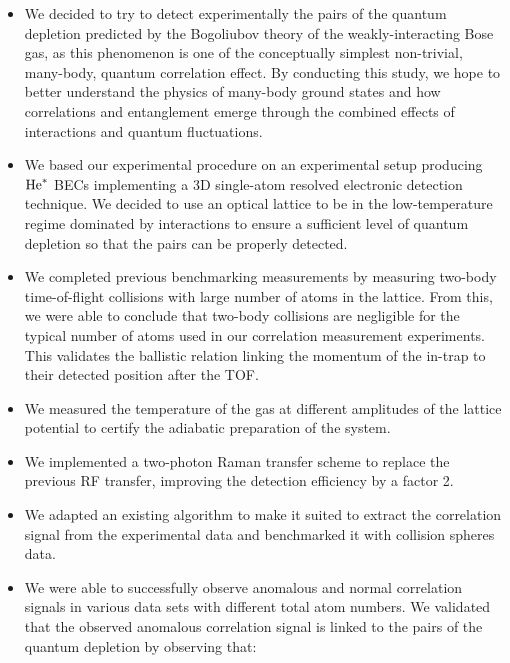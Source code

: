 \begin{itemize}
    \item We decided to try to detect experimentally the \kmk pairs of the quantum depletion predicted by the Bogoliubov theory of the weakly-interacting Bose gas, as this phenomenon is one of the conceptually simplest non-trivial, many-body, quantum correlation effect. By conducting this study, we hope to better understand the physics of many-body ground states and how correlations and entanglement emerge through the combined effects of interactions and quantum fluctuations.
    \item We based our experimental procedure on an experimental setup producing $\mathrm{He}^*$ BECs  implementing a 3D single-atom resolved electronic detection technique. We decided to use an optical lattice to be in the low-temperature regime dominated by interactions to ensure a sufficient level of quantum depletion so that the \kmk pairs can be properly detected.
    \item We completed previous benchmarking measurements \cite{cayla2018single} by measuring two-body time-of-flight collisions with large number of atoms in the lattice. From this, we were able to conclude that two-body collisions are negligible for the typical number of atoms used in our correlation measurement experiments. This validates the ballistic relation linking the momentum of the in-trap to their detected position after the TOF.
    \item We measured the temperature of the gas at different amplitudes of the lattice potential to certify the adiabatic preparation of the system.
    \item We implemented a two-photon Raman transfer scheme to replace the previous RF transfer, improving the detection efficiency by a factor 2.
    \item We adapted an existing algorithm to make it suited to extract the \kmk correlation signal from the experimental data and benchmarked it with collision spheres data.
    \item We were able to successfully observe anomalous and normal correlation signals in various data sets with different total atom numbers. We validated that the observed anomalous correlation signal is linked to the \kmk pairs of the quantum depletion by observing that:
    \begin{itemize}
        

\end{itemize}
\end{itemize}
